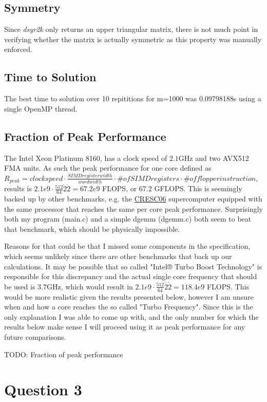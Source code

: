 \documentclass{scrartcl}
\begin{document}
\subsection{Symmetry}
Since \emph{dsyr2k} only returns an upper triangular matrix, there is not much point in verifying whether the matrix is actually symmetric as this property was manually enforced. 

\subsection{Time to Solution}

The best time to solution over 10 repititions for m=1000 was 0.09798188s using a single OpenMP thread.

\subsection{Fraction of Peak Performance}
The Intel Xeon Platinum 8160, has a clock speed of $2.1$GHz and two AVX512 FMA units.
As such the peak performance for one core defined as $R_{peak} = clockspeed \cdot \frac{SIMD register width}{word width} \cdot \# of SIMD registers \cdot \# of flop per instruction$,
results is $2.1e9 \cdot \frac{512}{64} \dot 2 \dot 2 = 67.2e9$ FLOPS, or $67.2$ GFLOPS.
This is seemingly backed up by other benchmarks, e.g. the \href{https://www.top500.org/system/179574/}{CRESC06} supercomputer equipped with the same processor that reaches the same per core peak performance.
Surprisingly both my program (main.c) and a simple dgemm (dgemm.c) both seem to beat that benchmark, which should be physically impossible.

Reasons for that could be that I missed some components in the specification, which seems unlikely since there are other benchmarks that back up our calculations.
It may be possible that so called "Intel® Turbo Boost Technology" is responsible for this discrepancy and the actual single core frequency that should be used is $3.7$GHz, which would result in $2.1e9 \cdot \frac{512}{64} \dot 2 \dot 2 = 118.4e9$ FLOPS.
This would be more realistic given the results presented below, however I am unsure when and how a core reaches the so called "Turbo Frequency".
Since this is the only explanation I was able to come up with, and the only number for which the results below make sense I will proceed using it as peak performance for any future comparisons.

TODO: Fraction of peak performance

\section{Question 3}
\end{document}
